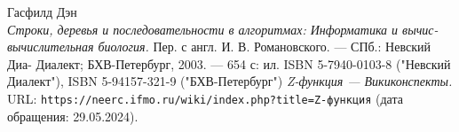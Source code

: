 \begin{thebibliography}{99}
Гасфилд Дэн\\
{\itshape Строки, деревья и последовательности в алгоритмах: Информатика и вычис-
вычислительная биология.}  Пер. с англ. И. В. Романовского. — СПб.: Невский Диа-
Диалект; БХВ-Петербург, 2003. — 654 с: ил. ISBN 5-7940-0103-8 ("Невский Диалект"), ISBN 5-94157-321-9 ("БХВ-Петербург")
{\itshape Z-функция — Викиконспекты.} \\URL: \texttt{https://neerc.ifmo.ru/wiki/index.php?title=Z-функция} (дата обращения: 29.05.2024).
\end{thebibliography}
\pagebreak
